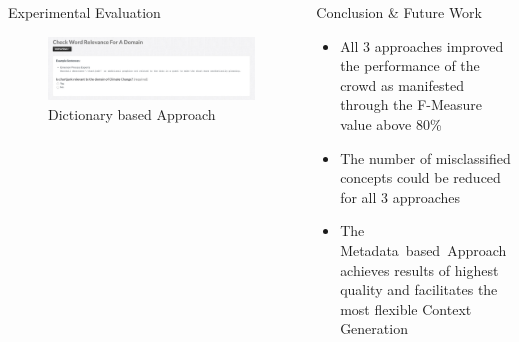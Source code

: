 \documentclass[final,hyperref={pdfpagelabels=true}]{beamer}
\begin{document}
\begin{frame}
\begin{columns}[t, onlytextwidth]
\begin{column}{\textwidth}
\begin{columns}[t, onlytextwidth]
\begin{column}{.49\textwidth}
\begin{block}{Experimental Evaluation}
\begin{minipage}[t][.25\textheight][c]{\textwidth}
\begin{minipage}[t]{0.93\textwidth}
\begin{minipage}[t]{\textwidth}
\begin{minipage}[t]{.49\textwidth}
\begin{minipage}[t]{\textwidth}
										\begin{figure}[H]
										 \centering
										 \includegraphics[width=\textwidth]{figures/questionaire_wordnik_example}
										 \caption{Dictionary based Approach}
										\end{figure}
									\end{minipage}
								\end{minipage}
							\end{minipage}
						\end{minipage}
						\hfill
						\hbox{}
						
					\end{minipage}
				\end{block}
			\end{column}
			\begin{column}{.49\textwidth}
				\begin{block}{Conclusion \& Future Work}
					\begin{minipage}[t][.25\textheight][c]{\textwidth}
						\hfill
						\begin{minipage}[t]{0.93\textwidth}
							\small
							{}
							
							\begin{itemize}
								\small
								\justifying
								\setlength\itemsep{1cm}
								\item All 3 approaches improved the performance of the crowd as manifested through the F-Measure value above 80\%
								\item The number of misclassified concepts could be reduced for all 3 approaches
								\item The Metadata~based~Approach achieves results of highest quality and facilitates the most flexible Context Generation
							\end{itemize}
							\vspace{1cm}
							
							\hrulefill
							
							\vspace{1.5cm}
							\small
							{}
							

\end{minipage}
\end{minipage}
\end{block}
\end{column}
\end{columns}
\end{column}
\end{columns}
\end{frame}
\end{document}
